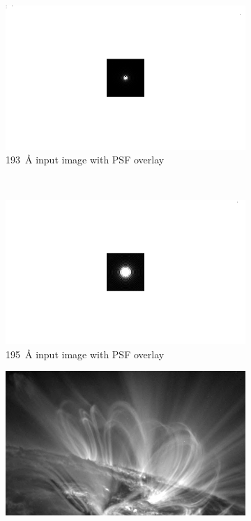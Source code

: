 \documentclass[10pt,letterpaper]{article}
\begin{document}
			
				\begin{figure}[h!]
					\centering
					\begin{subfigure}[t]{0.49\textwidth}
						\includegraphics[width=\textwidth]{psf/193/sunAndPsf}
						\caption{\SI{193}{\angstrom} input image with PSF overlay}
						\label{193a}
					\end{subfigure}
					~
					\begin{subfigure}[t]{0.49\textwidth}
						\includegraphics[width=\textwidth]{psf/195/sunAndPsf}	
						\caption{\SI{195}{\angstrom} input image with PSF overlay}
						\label{195a}
					\end{subfigure}
					\begin{subfigure}[t]{0.49\textwidth}
						\includegraphics[width=\textwidth]{psf/193/sun}

\end{subfigure}
\end{figure}
\end{document}
